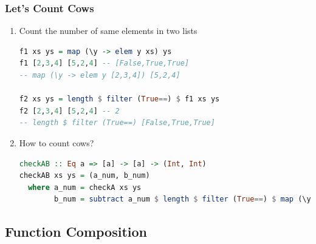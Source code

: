 \documentclass[10pt]{beamer}
\begin{document}
\begin{frame}[fragile]
\frametitle{Let's Count Cows}
    \begin{enumerate}\item Count the number of same elements in two lists\\
     \begin{lstlisting}[language=Haskell,numbers=none]
f1 xs ys = map (\y -> elem y xs) ys 
f1 [2,3,4] [5,2,4] -- [False,True,True]
-- map (\y -> elem y [2,3,4]) [5,2,4]

f2 xs ys = length $ filter (True==) $ f1 xs ys
f2 [2,3,4] [5,2,4] -- 2
-- length $ filter (True==) [False,True,True]
    \end{lstlisting}
        
    \item How to count cows?\\
     \begin{lstlisting}[language=Haskell,numbers=none]
checkAB :: Eq a => [a] -> [a] -> (Int, Int)
checkAB xs ys = (a_num, b_num)
  where a_num = checkA xs ys
        b_num = subtract a_num $ length $ filter (True==) $ map (\y -> elem y xs) ys
    \end{lstlisting}
    \end{enumerate}
\end{frame}








\subsection{Function Composition}
\end{document}
